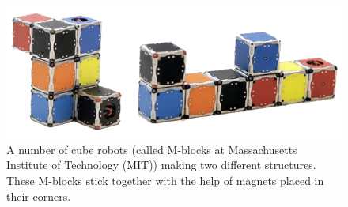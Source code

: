 %
\begin{figure}[H]
	\centering
	\includegraphics[scale=0.3]{figures/m-blocks2}
	\caption{A number of cube robots (called M-blocks at Massachusetts Institute of Technology (MIT)) making two different structures. These M-blocks stick together with the help of magnets placed in their corners.\cite{LRosen}}
	\label{MBlocksExample}
\end{figure}\vspace{-18pt}
